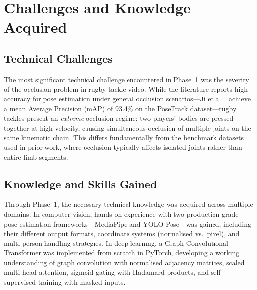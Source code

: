 \documentclass{article}
\begin{document}
\section{Challenges and Knowledge Acquired}
\label{sec:challenges}

\subsection{Technical Challenges}
\label{sec:challenges:technical}

The most significant technical challenge encountered in Phase~1 was the
severity of the occlusion problem in rugby tackle video.
While the literature reports high accuracy for pose estimation under
general occlusion scenarios---Ji et al.~\cite{ji2025gct} achieve a mean
Average Precision (mAP) of 93.4\% on the PoseTrack
dataset---rugby tackles present an \emph{extreme} occlusion regime:
two players' bodies are pressed together at high velocity, causing
simultaneous occlusion of multiple joints on the same kinematic chain.
This differs fundamentally from the benchmark datasets used in prior
work, where occlusion typically affects isolated joints rather than
entire limb segments.

\subsection{Knowledge and Skills Gained}
\label{sec:challenges:skills}

Through Phase~1, the necessary technical knowledge was acquired across
multiple domains.
In computer vision, hands-on experience with two production-grade pose
estimation frameworks---MediaPipe and YOLO-Pose---was gained, including
their different output formats, coordinate systems (normalised vs.\
pixel), and multi-person handling strategies.
In deep learning, a Graph Convolutional Transformer was implemented from
scratch in PyTorch, developing a working understanding of graph
convolution with normalised adjacency matrices, scaled multi-head
attention, sigmoid gating with Hadamard products, and self-supervised
training with masked inputs.
\end{document}
